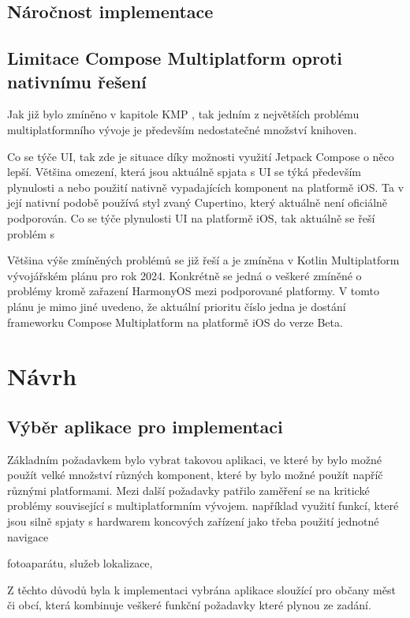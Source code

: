 \section{Náročnost implementace}
\section{Limitace Compose Multiplatform oproti nativnímu řešení} 
Jak již bylo zmíněno v kapitole KMP , tak jedním z největších problému multiplatformního vývoje je především nedostatečné množství knihoven. 

Co se týče UI, tak zde je situace díky možnosti využití Jetpack Compose o něco lepší. Většina omezení, která jsou
aktuálně spjata s UI se týká především plynulosti a nebo použití nativně vypadajících komponent na platformě iOS.
Ta v její nativní podobě používá styl zvaný Cupertino, který aktuálně není oficiálně podporován. Co se týče plynulosti UI
na platformě iOS, tak aktuálně se řeší problém s

Většina výše zmíněných problémů se již řeší a je zmíněna v Kotlin Multiplatform vývojářském plánu pro rok 2024. \cite{KMPRoaddMap} Konkrétně
se jedná o veškeré zmíněné o problémy kromě zařazení HarmonyOS mezi podporované platformy.%
V tomto plánu je mimo jiné uvedeno, že aktuální prioritu číslo jedna je dostání frameworku Compose Multiplatform na platformě iOS do verze Beta. \cite{KMPRoaddMap}

\chapter{Návrh}



\section{Výběr aplikace pro implementaci}
Základním požadavkem bylo vybrat takovou aplikaci, ve které by bylo možné použít velké množství různých komponent, 
které by bylo možné použít napříč různými platformami.
Mezi další požadavky patřilo zaměření se na kritické problémy související s multiplatformním vývojem. 
například využití funkcí, které jsou silně spjaty s hardwarem koncových zařízení jako třeba použití jednotné navigace

fotoaparátu, služeb lokalizace, 

Z těchto důvodů byla k implementaci vybrána aplikace sloužící pro občany měst či obcí, která kombinuje veškeré funkční
požadavky které plynou ze zadání.

